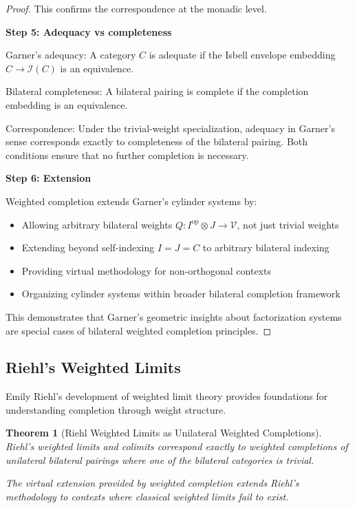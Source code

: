 \documentclass[11pt]{article}
\theoremstyle{plain}
\newtheorem{theorem}{Theorem}[section]
\theoremstyle{definition}
\theoremstyle{remark}
\newcommand{\V}{\mathcal{V}}
\newcommand{\op}{\mathrm{op}}
\begin{document}
\begin{proof}
This confirms the correspondence at the monadic level.

\textbf{Step 5: Adequacy vs completeness}

Garner's adequacy: A category $C$ is adequate if the Isbell envelope embedding $C \to \mathcal{I}(C)$ is an equivalence.

Bilateral completeness: A bilateral pairing is complete if the completion embedding is an equivalence.

Correspondence: Under the trivial-weight specialization, adequacy in Garner's sense corresponds exactly to completeness of the bilateral pairing. Both conditions ensure that no further completion is necessary.

\textbf{Step 6: Extension}

Weighted completion extends Garner's cylinder systems by:
\begin{itemize}
\item Allowing arbitrary bilateral weights $Q : I^{\op} \otimes J \to \V$, not just trivial weights
\item Extending beyond self-indexing $I = J = C$ to arbitrary bilateral indexing
\item Providing virtual methodology for non-orthogonal contexts
\item Organizing cylinder systems within broader bilateral completion framework
\end{itemize}

This demonstrates that Garner's geometric insights about factorization systems are special cases of bilateral weighted completion principles.
\end{proof}

\subsection{Riehl's Weighted Limits}

Emily Riehl's development of weighted limit theory \cite{riehl2008weighted,riehl2014categorical} provides foundations for understanding completion through weight structure.

\begin{theorem}[Riehl Weighted Limits as Unilateral Weighted Completions]\label{thm:riehl-correspondence}
Riehl's weighted limits and colimits correspond exactly to weighted completions of unilateral bilateral pairings where one of the bilateral categories is trivial.

The virtual extension provided by weighted completion extends Riehl's methodology to contexts where classical weighted limits fail to exist.
\end{theorem}
\end{document}
